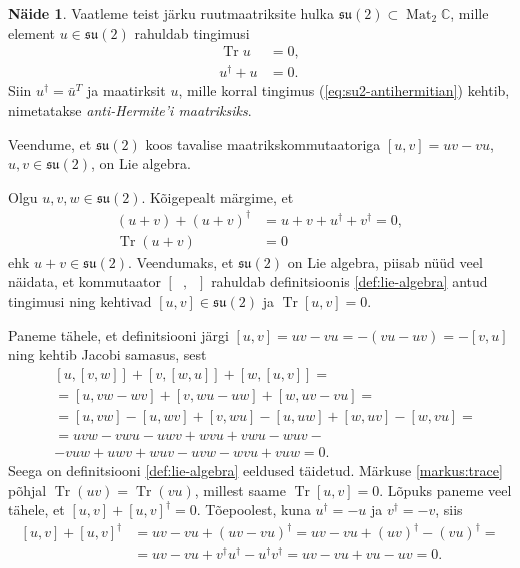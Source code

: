 \documentclass[12pt,a4paper,oneside]{article}
\theoremstyle{plain}
\theoremstyle{definition}
\newtheorem{naide}{Näide}[section]
\numberwithin{equation}{section}
\def\C{{\mathbb C}}
\def\su2{{\mathfrak{ su}\left(2\right)}}
\DeclareMathOperator{\Mat}{Mat}
\DeclareMathOperator{\Tr}{Tr}
\begin{document}
\begin{naide} \label{naide:su2}
Vaatleme teist järku ruutmaatriksite hulka $\su2 \subset \Mat_2 \C$, 
mille element $u \in \su2$ rahuldab tingimusi
\begin{align}
\Tr u &= 0, \label{eq:su2-tr=0}\\ 
u^\dagger + u &= 0. \label{eq:su2-antihermitian}
\end{align}
Siin $u^\dagger = \bar{u}^T$ ja maatirksit $u$, mille korral tingimus 
(\ref{eq:su2-antihermitian}) kehtib, nimetatakse \emph{anti-Hermite'i 
maatriksiks}.
 
Veendume, et $\su2$ koos tavalise maatrikskommutaatoriga 
$\left[u,v\right] = uv - vu$, $u, v \in \su2$, on Lie algebra.

Olgu $u, v, w \in \su2$. Kõigepealt märgime, et 
\begin{align*}
\left(u + v\right) + \left(u + v\right)^\dagger &= 
u + v + u^\dagger + v^\dagger = 0, \\
\Tr \left(u + v\right) &= 0
\end{align*}
ehk $u + v \in \su2$. Veendumaks, et $\su2$ on Lie algebra, piisab 
nüüd veel näidata, et kommutaator $\left[\phantom{u}, 
\phantom{u}\right]$ rahuldab definitsioonis \ref{def:lie-algebra} 
antud tingimusi ning kehtivad $\left[u,v\right] \in \su2$ ja 
$\Tr \left[u,v\right] = 0$. 

Paneme tähele, et definitsiooni järgi $\left[u,v\right] = 
uv - vu = - \left(vu - uv\right) = - \left[v,u\right]$ ning 
kehtib Jacobi samasus, sest
\begin{align*}
&\left[u, \left[v, w\right]\right] + 
	\left[v, \left[w, u\right]\right] + 
	\left[w, \left[u, v\right]\right] = \\
&= \left[u, vw - wv \right] + 
	\left[v, wu - uw \right] + 
	\left[w, uv - vu \right] = \\
&= \left[u, vw\right] - \left[u, wv\right] + 
	\left[v, wu\right] - \left[u, uw\right] + 
	\left[w, uv\right] - \left[w, vu\right] = \\
&= uvw - vwu - uwv + wvu + vwu - wuv - \\
&- vuw + uwv + wuv - uvw - wvu + vuw = 0.
\end{align*}
Seega on definitsiooni \ref{def:lie-algebra} eeldused täidetud. 
Märkuse \ref{markus:trace} põhjal $\Tr \left(uv\right) = 
\Tr \left(vu\right)$, millest saame $\Tr \left[u,v\right] = 0$. 
Lõpuks paneme veel tähele, et $\left[u,v\right] + 
\left[u,v\right]^\dagger = 0$. Tõepoolest, kuna $u^\dagger = -u$ ja 
$v^\dagger = -v$, siis
\begin{align*}
\left[u,v\right] + \left[u,v\right]^\dagger &= uv - vu + 
\left(uv - vu\right)^\dagger = uv - vu + \left(uv\right)^\dagger - 
\left(vu\right)^\dagger = \\
&= uv - vu + v^\dagger u^\dagger - u^\dagger v^\dagger = 
uv - vu + vu - uv = 0.
\end{align*}
\end{naide}
\end{document}
